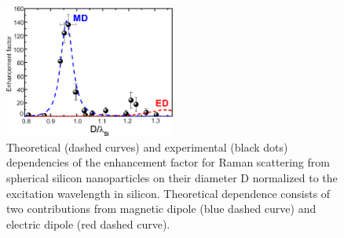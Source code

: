         \begin{figure}[!hb]
            \begin{center}
                \includegraphics[width=0.5\textwidth]{figs/results/enhance/EnhancementExperimentTheory.eps}
            \end{center}
            \caption{Theoretical (dashed curves) and experimental (black dots) dependencies of the enhancement factor for Raman
            scattering from spherical silicon nanoparticles on their diameter D normalized to the excitation wavelength in silicon.
            Theoretical dependence consists of two contributions from magnetic dipole (blue dashed curve) and electric dipole
            (red dashed curve).}
            \label{fig:EnhancementExpTheory}
        \end{figure}
